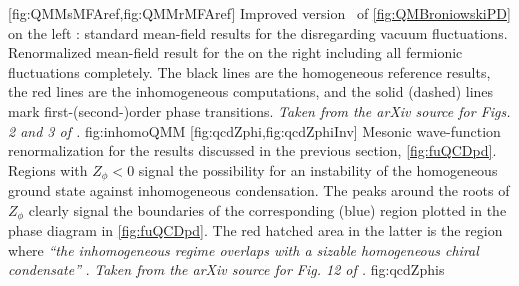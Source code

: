 	[fig:QMMsMFAref,fig:QMMrMFAref]
	{%
		Improved version~\cite{Adhikari:2017ydi} of \cref{fig:QMBroniowskiPD} on the left : standard mean-field results for the \qmm{} disregarding vacuum fluctuations.
		Renormalized mean-field result for the \qmm{} on the right  including all fermionic fluctuations completely.
		The black lines are the homogeneous reference results, the red lines are the inhomogeneous computations, and the solid (dashed) lines mark first-(second-)order phase transitions.
		\textit{Taken from the arXiv source for Figs. 2 and 3 of .}
	}%
	{fig:inhomoQMM}
	[fig:qcdZphi,fig:qcdZphiInv]%
	{%
	Mesonic wave-function renormalization for the \frg{} \qcd{} results discussed in the previous section, \cf{} \cref{fig:fuQCDpd}.
	Regions with $Z_\phi<0$ signal the possibility for an instability of the homogeneous ground state against inhomogeneous condensation.
	The peaks around the roots of $Z_\phi$ clearly signal the boundaries of the corresponding (blue) region plotted in the phase diagram in \cref{fig:fuQCDpd}.
	The red hatched area in the latter is the region where \textit{``the inhomogeneous regime overlaps with a sizable homogeneous chiral condensate''} .
	\textit{Taken from the arXiv source for Fig. 12 of .}
	}%
	{fig:qcdZphis}%
